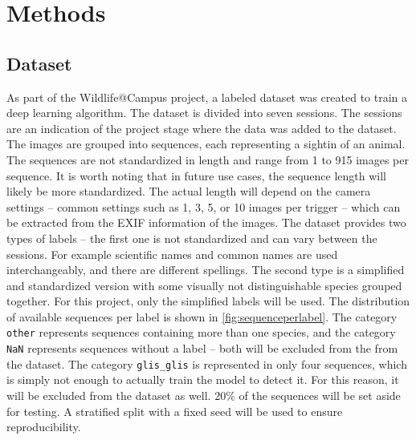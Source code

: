 

\section{Methods}
\label{methods}

    \subsection{Dataset}

    As part of the Wildlife@Campus project, a labeled dataset was created to train a deep learning algorithm.
    The dataset is divided into seven sessions.
    The sessions are an indication of the project stage where the data was added to the dataset.
    The images are grouped into sequences, each representing a sightin of an animal.
    The sequences are not standardized in length and range from 1 to 915 images per sequence.
    It is worth noting that in future use cases, the sequence length will likely be more standardized.
    The actual length will depend on the camera settings -- common settings such as 1, 3, 5, or 10 images per trigger -- which can be extracted from the EXIF information of the images.
    The dataset provides two types of labels -- the first one is not standardized and can vary between the sessions.
    For example scientific names and common names are used interchangeably, and there are different spellings.
    The second type is a simplified and standardized version with some visually not distinguishable species grouped together.
    For this project, only the simplified labels will be used.
    The distribution of available sequences per label is shown in \autoref{fig:sequenceperlabel}.
    The category \texttt{other} represents sequences containing more than one species, and the category \texttt{NaN} represents sequences without a label -- both will be excluded from the from the dataset.
    The category \texttt{glis\_glis} is represented in only four sequences, which is simply not enough to actually train the model to detect it.
    For this reason, it will be excluded from the dataset as well.
    20\% of the sequences will be set aside for testing.
    A stratified split with a fixed seed will be used to ensure reproducibility.

